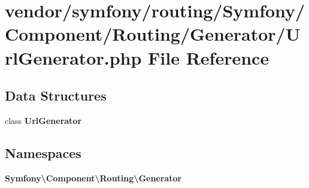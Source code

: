 \section{vendor/symfony/routing/\+Symfony/\+Component/\+Routing/\+Generator/\+Url\+Generator.php File Reference}
\label{symfony_2routing_2_symfony_2_component_2_routing_2_generator_2_url_generator_8php}
\subsection*{Data Structures}
\begin{DoxyCompactItemize}
\item 
class {\bf Url\+Generator}
\end{DoxyCompactItemize}
\subsection*{Namespaces}
\begin{DoxyCompactItemize}
\item 
 {\bf Symfony\textbackslash{}\+Component\textbackslash{}\+Routing\textbackslash{}\+Generator}
\end{DoxyCompactItemize}
